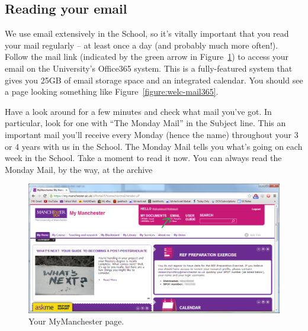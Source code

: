 \subsection{Reading your email}

We use email extensively in the School, so it's vitally important that
you read your mail regularly -- at least once a day (and probably much
more often!). Follow the mail link (indicated by the green arrow in
Figure~\ref{figure:welc-mymanchester}) to access your email on the
University's Office365 system. This is a fully-featured system that
gives you 25GB of email storage space and an integrated calendar. You should
see a page looking something like Figure~\ref{figure:welc-mail365}.

Have a look around for a few minutes and check what mail you've
got. In particular, look for one with ``The Monday Mail'' in the
Subject line. This an important mail you'll receive every Monday
(hence the name) throughout your 3 or 4 years with us in the
School. The Monday Mail tells you what's going on each week in the
School. Take a moment to read it now. You can always read the Monday Mail, by the way, at the archive 

\begin{figure}
\centerline{\includegraphics[width=15cm]{images/hamza-email-link.png}}
\caption{Your MyManchester page.}
\label{figure:welc-mymanchester}
\end{figure}

